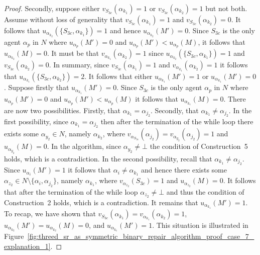\begin{proof}
Secondly, suppose either $v_{S_{3c}}(\alpha_{k_1})=1$ or $v_{S_{3c}}(\alpha_{k_2})=1$ but not both. Assume without loss of generality that $v_{S_{3c}}(\alpha_{k_1})=1$ and $v_{S_{3c}}(\alpha_{k_2})=0$. It follows that $u_{\alpha_{k_2}}(\{ S_{3c}, \alpha_{k_1} \})=1$ and hence $u_{\alpha_{k_2}}(M')=0$. Since $S_{3c}$ is the only agent $\alpha_p$ in $N$ where $u_{\alpha_p}(M')=0$ and $u_{\alpha_p}(M') < u_{\alpha_p}(M)$, it follows that $u_{\alpha_{k_2}}(M)=0$. It must be that $v_{\alpha_{k_1}}(\alpha_{k_2})=1$ since $u_{\alpha_{k_2}}(\{ S_{3c}, \alpha_{k_1} \})=1$ and $v_{S_{3c}}(\alpha_{k_2})=0$. In summary, since $v_{S_{3c}}(\alpha_{k_1})=1$ and $v_{\alpha_{k_1}}(\alpha_{k_2})=1$ it follows that $u_{\alpha_{k_1}}(\{ S_{3c}, \alpha_{k_2} \})=2$. It follows that either $u_{\alpha_{k_1}}(M')=1$ or $u_{\alpha_{k_1}}(M')=0$. Suppose firstly that $u_{\alpha_{k_1}}(M')=0$. Since $S_{3c}$ is the only agent $\alpha_p$ in $N$ where $u_{\alpha_p}(M')=0$ and $u_{\alpha_p}(M') < u_{\alpha_p}(M)$ it follows that $u_{\alpha_{k_1}}(M)=0$. There are now two possibilities. Firstly, that $\alpha_{k_1}=\alpha_{j_2}$. Secondly, that $\alpha_{k_1} \neq \alpha_{j_2}$. In the first possibility, since $\alpha_{k_1}=\alpha_{j_2}$ then after the termination of the while loop there exists some $\alpha_{y_2}\in N$, namely $\alpha_{k_2}$, where $v_{\alpha_{S_{3c}}}(\alpha_{j_2})=v_{\alpha_{y_2}}(\alpha_{j_2})=1$ and $u_{\alpha_{y_2}}(M)=0$. In the algorithm, since $\alpha_{y_2}\neq \bot$ the condition of Construction~5 holds, which is a contradiction. In the second possibility, recall that $\alpha_{k_1} \neq \alpha_{j_2}$. Since $u_{\alpha_i}(M')=1$ it follows that $\alpha_i\neq \alpha_{k_1}$ and hence there exists some $\alpha_{z_2} \in N\setminus \{\alpha_i, \alpha_{j_2} \}$, namely $\alpha_{k_1}$, where $v_{\alpha_{z_2}}(S_{3c})=1$ and $u_{\alpha_{z_2}}(M)=0$. It follows that after the termination of the while loop $\alpha_{z_2} \neq \bot$ and thus the condition of Construction~2 holds, which is a contradiction. It remains that $u_{\alpha_{k_1}}(M')=1$. To recap, we have shown that $v_{S_{3c}}(\alpha_{k_1})=v_{\alpha_{k_1}}(\alpha_{k_2})=1$, $u_{\alpha_{k_2}}(M')=u_{\alpha_{k_2}}(M)=0$, and $u_{\alpha_{k_1}}(M')=1$. This situation is illustrated in Figure~\ref{fig:threed_sr_as_symmetric_binary_repair_algorithm_proof_case_7_explanation_1}.


\end{proof}
